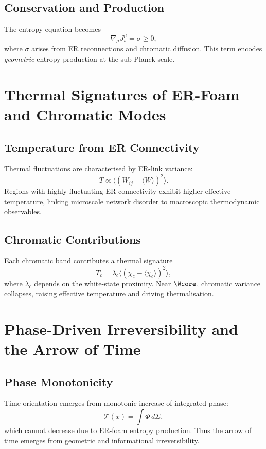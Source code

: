 \section{Conservation and Production}

The entropy equation becomes
\[
\nabla_\mu J^\mu_s = \sigma \ge 0,
\]
where $\sigma$ arises from ER reconnections and chromatic diffusion.
This term encodes \emph{geometric} entropy production at the sub-Planck scale.

\chapter{Thermal Signatures of ER-Foam and Chromatic Modes}

\section{Temperature from ER Connectivity}

Thermal fluctuations are characterised by ER-link variance:
\[
T \propto \langle (W_{ij} - \langle W\rangle)^2 \rangle.
\]
Regions with highly fluctuating ER connectivity exhibit higher effective temperature, linking microscale network disorder to macroscopic thermodynamic observables.

\section{Chromatic Contributions}

Each chromatic band contributes a thermal signature
\[
T_c = \lambda_c \langle (\chi_c - \langle\chi_c\rangle)^2\rangle,
\]
where $\lambda_c$ depends on the white-state proximity.
Near $\Wcore$, chromatic variance collapses, raising effective temperature and driving thermalisation.

\chapter{Phase-Driven Irreversibility and the Arrow of Time}

\section{Phase Monotonicity}

Time orientation emerges from monotonic increase of integrated phase:
\[
\mathcal{T}(x) = \int \Phi\, d\Sigma,
\]
which cannot decrease due to ER-foam entropy production.
Thus the arrow of time emerges from geometric and informational irreversibility.

